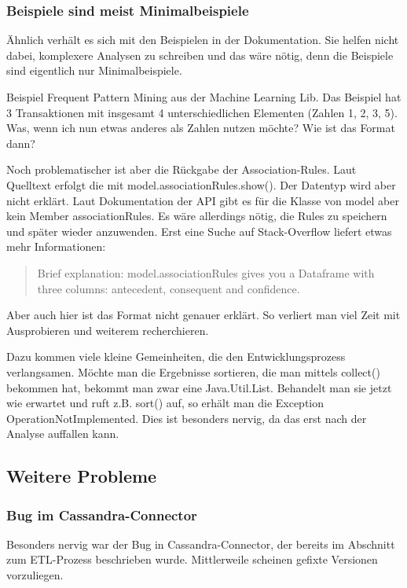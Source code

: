 \bigskip


\bigskip

\subsubsection{Beispiele sind meist
Minimalbeispiele}
Ähnlich verhält es sich mit den Beispielen in der Dokumentation. Sie
helfen nicht dabei, komplexere Analysen zu schreiben und das wäre
nötig, denn die Beispiele sind eigentlich nur Minimalbeispiele.

Beispiel Frequent Pattern Mining aus der Machine Learning Lib. Das
Beispiel hat 3 Transaktionen mit insgesamt 4 unterschiedlichen
Elementen (Zahlen 1, 2, 3, 5). Was, wenn ich nun etwas anderes als Zahlen
nutzen möchte? Wie ist das Format dann?

Noch problematischer ist aber die Rückgabe der Association-Rules. Laut
Quelltext erfolgt die mit model.associationRules.show(). Der Datentyp
wird aber nicht erklärt. Laut Dokumentation der API gibt es für die
Klasse von model aber kein Member associationRules. Es wäre allerdings
nötig, die Rules zu speichern und später wieder anzuwenden. Erst eine
Suche auf Stack-Overflow liefert etwas mehr Informationen:

\begin{quotation}
Brief explanation: model.associationRules gives you a Dataframe with
three columns: antecedent, consequent and confidence.
\end{quotation}

Aber auch hier ist das Format nicht genauer erklärt. So verliert man
viel Zeit mit Ausprobieren und weiterem recherchieren.

Dazu kommen viele kleine Gemeinheiten, die den Entwicklungsprozess
verlangsamen. Möchte man die Ergebnisse sortieren, die man mittels
collect() bekommen hat, bekommt man zwar eine Java.Util.List. Behandelt
man sie jetzt wie erwartet und ruft z.B. sort() auf, so erhält man die
Exception OperationNotImplemented. Dies ist besonders nervig, da das
erst nach der Analyse auffallen kann.


\subsection{Weitere Probleme}

\bigskip

\subsubsection{Bug im Cassandra-Connector}
Besonders nervig war der Bug in Cassandra-Connector, der bereits im
Abschnitt zum ETL-Prozess beschrieben wurde. Mittlerweile scheinen
gefixte Versionen vorzuliegen.

